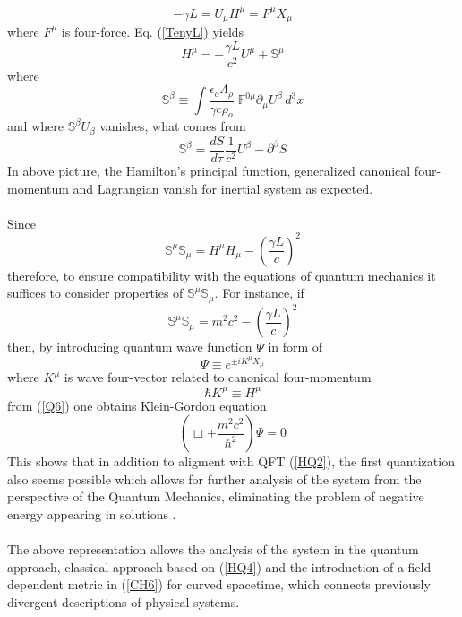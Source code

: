 \documentclass[aps,prx,preprint,groupedaddress,showkeys]{revtex4-2}
\newcommand{\mds}[1] {\frac{d {#1}}{d\tau}}
\begin{document}
\begin{equation} \label{Q4}
- \gamma L = U_{\mu} H^{\mu}= F^{\mu} X_{\mu} 
\end{equation}
where $F^{\mu}$ is four-force. Eq. (\ref{TenyL}) yields
\begin{equation} \label{Q5}
H^{\mu} = - \frac{\gamma L}{c^2}U^{\mu} + \mathbb{S}^{\mu}
\end{equation}
where
\begin{equation} \label{Q5}
\mathbb{S}^{\beta} \equiv \int \frac{\epsilon_o \Lambda_{\rho}}{\gamma c \rho_o} \; \mathbb{F}^{0 \mu} \partial_{\mu} U^{\beta}  \, d^3 x
\end{equation}
and where $\mathbb{S}^{\beta}U_{\beta}$ vanishes, what comes from 
\begin{equation} \label{Q5a}
\mathbb{S}^{\beta} = \mds{S}  \frac{1}{c^2} U^{\beta} - \partial^{\beta} S 
\end{equation}
In above picture, the Hamilton's principal function, generalized canonical four-momentum and Lagrangian vanish for inertial system as expected. \\
~\\
Since
\begin{equation} \label{Q6}
\mathbb{S}^{\mu}\mathbb{S}_{\mu} = H^{\mu}H_{\mu} - \left ( \frac{\gamma L}{c} \right )^2
\end{equation}
therefore, to ensure compatibility with the equations of quantum mechanics it suffices to consider properties of $\mathbb{S}^{\mu}\mathbb{S}_{\mu}$. For instance, if
\begin{equation} \label{Q7}
\mathbb{S}^{\mu}\mathbb{S}_{\mu} = m^2c^2 - \left ( \frac{\gamma L}{c} \right )^2
\end{equation}
then, by introducing quantum wave function $\Psi$ in form of 
\begin{equation} \label{Q8}
\Psi \equiv e^{\pm iK^{\mu} X_{\mu}}
\end{equation} 
where $K^{\mu}$ is wave four-vector related to canonical four-momentum 
\begin{equation} \label{Q9}
\hbar  K^{\mu} \equiv H^{\mu}
\end{equation}
from (\ref{Q6}) one obtains Klein-Gordon equation
\begin{equation} \label{Q10}
\left ( \Box + \frac{m^2c^2}{\hbar^2} \right ) \Psi = 0
\end{equation} 
This shows that in addition to aligment with QFT (\ref{HQ2}), the first quantization also seems possible which allows for further analysis of the system from the perspective of the Quantum Mechanics, eliminating the problem of negative energy appearing in solutions \cite{KGE}. \\
~\\
The above representation allows the analysis of the system in the quantum approach, classical approach based on (\ref{HQ4}) and the introduction of a field-dependent metric in (\ref{CH6}) for curved spacetime, which connects previously divergent descriptions of physical systems.
\end{document}

